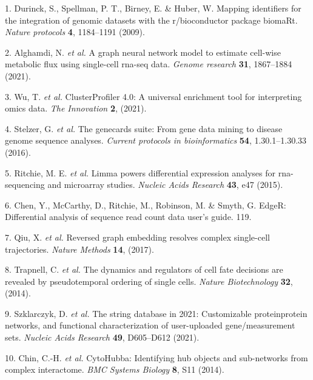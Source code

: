 \documentclass[
]{article}
\newenvironment{cslreferences}%
  {}%
  {\par}
\begin{document}
\hypertarget{refs}{}
\begin{cslreferences}
\leavevmode\hypertarget{ref-MappingIdentifDurinc2009}{}%
1. Durinck, S., Spellman, P. T., Birney, E. \& Huber, W. Mapping identifiers for the integration of genomic datasets with the r/bioconductor package biomaRt. \emph{Nature protocols} \textbf{4}, 1184--1191 (2009).

\leavevmode\hypertarget{ref-AGraphNeuralAlgham2021}{}%
2. Alghamdi, N. \emph{et al.} A graph neural network model to estimate cell-wise metabolic flux using single-cell rna-seq data. \emph{Genome research} \textbf{31}, 1867--1884 (2021).

\leavevmode\hypertarget{ref-ClusterprofilerWuTi2021}{}%
3. Wu, T. \emph{et al.} ClusterProfiler 4.0: A universal enrichment tool for interpreting omics data. \emph{The Innovation} \textbf{2}, (2021).

\leavevmode\hypertarget{ref-TheGenecardsSStelze2016}{}%
4. Stelzer, G. \emph{et al.} The genecards suite: From gene data mining to disease genome sequence analyses. \emph{Current protocols in bioinformatics} \textbf{54}, 1.30.1--1.30.33 (2016).

\leavevmode\hypertarget{ref-LimmaPowersDiRitchi2015}{}%
5. Ritchie, M. E. \emph{et al.} Limma powers differential expression analyses for rna-sequencing and microarray studies. \emph{Nucleic Acids Research} \textbf{43}, e47 (2015).

\leavevmode\hypertarget{ref-EdgerDifferenChen}{}%
6. Chen, Y., McCarthy, D., Ritchie, M., Robinson, M. \& Smyth, G. EdgeR: Differential analysis of sequence read count data user's guide. 119.

\leavevmode\hypertarget{ref-ReversedGraphQiuX2017}{}%
7. Qiu, X. \emph{et al.} Reversed graph embedding resolves complex single-cell trajectories. \emph{Nature Methods} \textbf{14}, (2017).

\leavevmode\hypertarget{ref-TheDynamicsAnTrapne2014}{}%
8. Trapnell, C. \emph{et al.} The dynamics and regulators of cell fate decisions are revealed by pseudotemporal ordering of single cells. \emph{Nature Biotechnology} \textbf{32}, (2014).

\leavevmode\hypertarget{ref-TheStringDataSzklar2021}{}%
9. Szklarczyk, D. \emph{et al.} The string database in 2021: Customizable proteinprotein networks, and functional characterization of user-uploaded gene/measurement sets. \emph{Nucleic Acids Research} \textbf{49}, D605--D612 (2021).

\leavevmode\hypertarget{ref-CytohubbaIdenChin2014}{}%
10. Chin, C.-H. \emph{et al.} CytoHubba: Identifying hub objects and sub-networks from complex interactome. \emph{BMC Systems Biology} \textbf{8}, S11 (2014).


\end{cslreferences}
\end{document}
